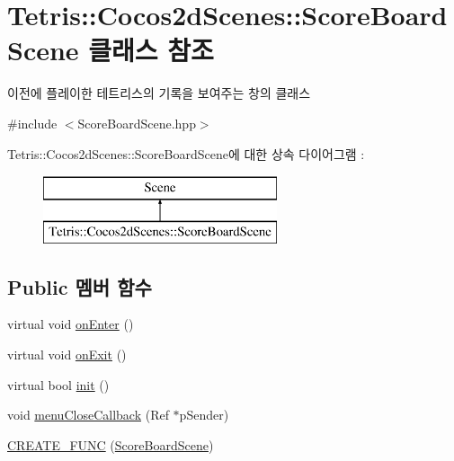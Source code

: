 \hypertarget{class_tetris_1_1_cocos2d_scenes_1_1_score_board_scene}{}\section{Tetris\+:\+:Cocos2d\+Scenes\+:\+:Score\+Board\+Scene 클래스 참조}
\label{class_tetris_1_1_cocos2d_scenes_1_1_score_board_scene}


이전에 플레이한 테트리스의 기록을 보여주는 창의 클래스  




{\ttfamily \#include $<$Score\+Board\+Scene.\+hpp$>$}

Tetris\+:\+:Cocos2d\+Scenes\+:\+:Score\+Board\+Scene에 대한 상속 다이어그램 \+: \begin{figure}[H]
\begin{center}
\leavevmode
\includegraphics[height=2.000000cm]{class_tetris_1_1_cocos2d_scenes_1_1_score_board_scene}
\end{center}
\end{figure}
\subsection*{Public 멤버 함수}
\begin{DoxyCompactItemize}
\item 
virtual void \hyperlink{class_tetris_1_1_cocos2d_scenes_1_1_score_board_scene_a667d5d9ca7709281c7b67814e5495a26}{on\+Enter} ()
\item 
virtual void \hyperlink{class_tetris_1_1_cocos2d_scenes_1_1_score_board_scene_ade9d785bcda22a7d410c316909377ff8}{on\+Exit} ()
\item 
virtual bool \hyperlink{class_tetris_1_1_cocos2d_scenes_1_1_score_board_scene_a348c50d4213a4fee3888c216c16712ef}{init} ()
\item 
void \hyperlink{class_tetris_1_1_cocos2d_scenes_1_1_score_board_scene_ad17f53b26718969718fed03b2b38ff61}{menu\+Close\+Callback} (Ref $\ast$p\+Sender)
\item 
\hyperlink{class_tetris_1_1_cocos2d_scenes_1_1_score_board_scene_afe728259a0507c6fdec598ef5334a3a5}{C\+R\+E\+A\+T\+E\+\_\+\+F\+U\+NC} (\hyperlink{class_tetris_1_1_cocos2d_scenes_1_1_score_board_scene}{Score\+Board\+Scene})
\end{DoxyCompactItemize}
